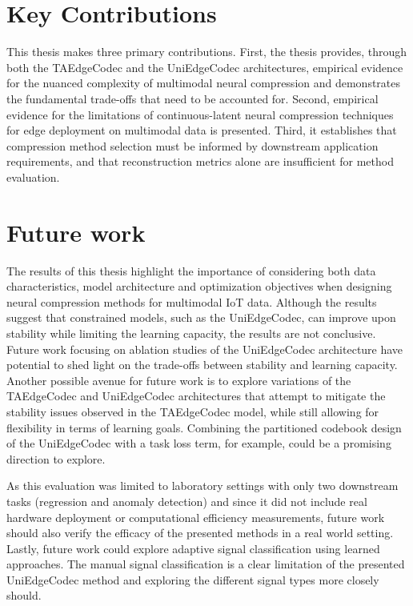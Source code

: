 \section{Key Contributions} 

This thesis makes three primary contributions. First, the thesis provides, through both the TAEdgeCodec and the UniEdgeCodec architectures, empirical evidence for the nuanced complexity of multimodal neural compression and demonstrates the fundamental trade-offs that need to be accounted for. Second, empirical evidence for the limitations of continuous-latent neural compression techniques for edge deployment on multimodal data is presented. Third, it establishes that compression method selection must be informed by downstream application requirements, and that reconstruction metrics alone are insufficient for method evaluation. 

\section{Future work}
The results of this thesis highlight the importance of considering both data characteristics, model architecture and optimization objectives when designing neural compression methods for multimodal IoT data. Although the results suggest that constrained models, such as the UniEdgeCodec, can improve upon stability while limiting the learning capacity, the results are not conclusive. Future work focusing on ablation studies of the UniEdgeCodec architecture have potential to shed light on the trade-offs between stability and learning capacity. Another possible avenue for future work is to explore variations of the TAEdgeCodec and UniEdgeCodec architectures that attempt to mitigate the stability issues observed in the TAEdgeCodec model, while still allowing for flexibility in terms of learning goals. Combining the partitioned codebook design of the UniEdgeCodec with a task loss term, for example, could be a promising direction to explore. 

As this evaluation was limited to laboratory settings with only two downstream tasks (regression and anomaly detection) and since it did not include real hardware deployment or computational efficiency measurements, future work should also verify the efficacy of the presented methods in a real world setting. Lastly, future work could explore adaptive signal classification using learned approaches. The manual signal classification is a clear limitation of the presented UniEdgeCodec method and exploring the different signal types more closely should.
